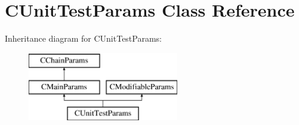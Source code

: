 \hypertarget{class_c_unit_test_params}{}\section{C\+Unit\+Test\+Params Class Reference}
\label{class_c_unit_test_params}
Inheritance diagram for C\+Unit\+Test\+Params\+:\begin{figure}[H]
\begin{center}
\leavevmode
\includegraphics[height=3.000000cm]{class_c_unit_test_params}
\end{center}
\end{figure}
